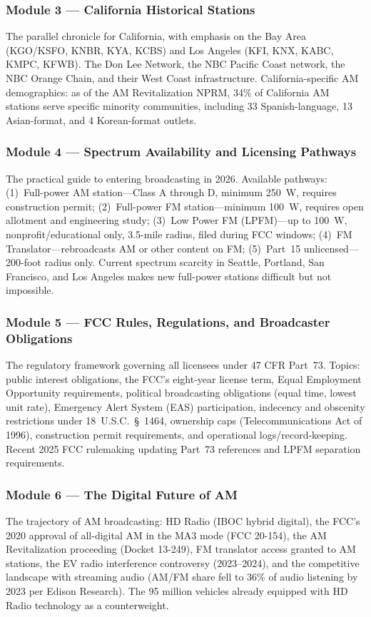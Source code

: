\documentclass[11pt,letterpaper]{article}
\begin{document}
\subsubsection{Module 3 --- California Historical Stations}
The parallel chronicle for California, with emphasis on the Bay Area (KGO/KSFO, KNBR, KYA, KCBS)
and Los Angeles (KFI, KNX, KABC, KMPC, KFWB). The Don Lee Network, the NBC Pacific Coast
network, the NBC Orange Chain, and their West Coast infrastructure. California-specific AM
demographics: as of the AM Revitalization NPRM, 34\% of California AM stations serve specific
minority communities, including 33 Spanish-language, 13 Asian-format, and 4 Korean-format outlets.

\subsubsection{Module 4 --- Spectrum Availability and Licensing Pathways}
The practical guide to entering broadcasting in 2026. Available pathways: (1)~Full-power AM
station---Class A through D, minimum 250~W, requires construction permit; (2)~Full-power FM
station---minimum 100~W, requires open allotment and engineering study; (3)~Low Power FM
(LPFM)---up to 100~W, nonprofit/educational only, 3.5-mile radius, filed during FCC windows;
(4)~FM Translator---rebroadcasts AM or other content on FM; (5)~Part~15 unlicensed---200-foot
radius only. Current spectrum scarcity in Seattle, Portland, San Francisco, and Los Angeles
makes new full-power stations difficult but not impossible.

\subsubsection{Module 5 --- FCC Rules, Regulations, and Broadcaster Obligations}
The regulatory framework governing all licensees under 47 CFR Part~73. Topics: public interest
obligations, the FCC's eight-year license term, Equal Employment Opportunity requirements,
political broadcasting obligations (equal time, lowest unit rate), Emergency Alert System (EAS)
participation, indecency and obscenity restrictions under 18~U.S.C.~\S~1464, ownership caps
(Telecommunications Act of 1996), construction permit requirements, and operational
logs/record-keeping. Recent 2025 FCC rulemaking updating Part~73 references and LPFM separation
requirements.

\subsubsection{Module 6 --- The Digital Future of AM}
The trajectory of AM broadcasting: HD Radio (IBOC hybrid digital), the FCC's 2020 approval of
all-digital AM in the MA3 mode (FCC 20-154), the AM Revitalization proceeding (Docket 13-249),
FM translator access granted to AM stations, the EV radio interference controversy (2023--2024),
and the competitive landscape with streaming audio (AM/FM share fell to 36\% of audio listening
by 2023 per Edison Research). The 95 million vehicles already equipped with HD Radio technology
as a counterweight.
\end{document}
